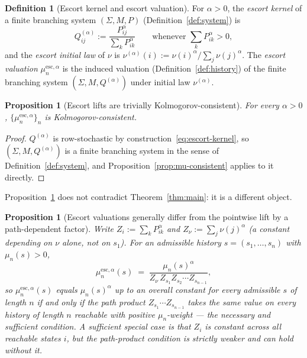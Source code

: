 \documentclass[11pt,a4paper]{article}
\newtheorem{proposition}[theorem]{Proposition}
\theoremstyle{definition}
\newtheorem{definition}[theorem]{Definition}
\theoremstyle{remark}
\newcommand{\Sh}{\Sigma}
\begin{document}
\begin{definition}[Escort kernel and escort valuation]
  \label{def:escort}
  For $\alpha>0$, the \emph{escort kernel} of a finite branching system $(\Sh,M,P)$
  (Definition~\ref{def:system}) is
  \begin{equation}
    \label{eq:escort-kernel}
    Q^{(\alpha)}_{ij} := \frac{P_{ij}^\alpha}{\sum_{k} P_{ik}^\alpha}
    \qquad \text{whenever } \textstyle\sum_k P_{ik}^\alpha > 0,
  \end{equation}
  and the \emph{escort initial law} of $\nu$ is
  $\nu^{(\alpha)}(i) := \nu(i)^\alpha / \sum_j \nu(j)^\alpha$. The \emph{escort
  valuation} $\mu_n^{\mathrm{esc},\alpha}$ is the induced valuation
  (Definition~\ref{def:history}) of the finite branching system $(\Sh,M,Q^{(\alpha)})$
  under initial law $\nu^{(\alpha)}$.
\end{definition}

\begin{proposition}[Escort lifts are trivially Kolmogorov-consistent]
  \label{prop:escort-consistent}
  For every $\alpha>0$, $\{\mu_n^{\mathrm{esc},\alpha}\}_n$ is Kolmogorov-consistent.
\end{proposition}

\begin{proof}
  $Q^{(\alpha)}$ is row-stochastic by construction~\eqref{eq:escort-kernel}, so
  $(\Sh,M,Q^{(\alpha)})$ is a finite branching system in the sense of
  Definition~\ref{def:system}, and Proposition~\ref{prop:mu-consistent} applies to it
  directly.
\end{proof}

Proposition~\ref{prop:escort-consistent} does not contradict Theorem~\ref{thm:main}: it
is a different object.

\begin{proposition}[Escort valuations generally differ from the pointwise lift by a
  path-dependent factor]
  \label{prop:escort-differs}
  Write $Z_i := \sum_k P_{ik}^\alpha$ and $Z_\nu := \sum_j \nu(j)^\alpha$ (a constant
  depending on $\nu$ alone, not on $s_1$). For an admissible history
  $s=(s_1,\dots,s_n)$ with $\mu_n(s)>0$,
  \begin{equation}
    \label{eq:escort-vs-lift}
    \mu_n^{\mathrm{esc},\alpha}(s) \;=\; \frac{\mu_n(s)^\alpha}{Z_\nu\,
    Z_{s_1} Z_{s_2} \cdots Z_{s_{n-1}}},
  \end{equation}
  so $\mu_n^{\mathrm{esc},\alpha}(s)$ equals $\mu_n(s)^\alpha$ up to an overall constant
  for every admissible $s$ of length $n$ if and only if the path product
  $Z_{s_1}\cdots Z_{s_{n-1}}$ takes the same value on every history of length $n$
  reachable with positive $\mu_n$-weight --- the necessary and sufficient condition.
  A sufficient special case is that $Z_i$ is constant across all reachable states $i$,
  but the path-product condition is strictly weaker and can hold without it.
\end{proposition}
\end{document}
